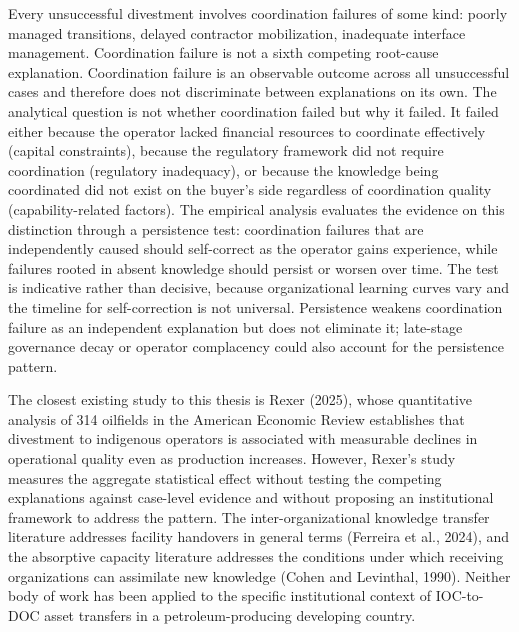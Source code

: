 Every unsuccessful divestment involves coordination failures of some
kind: poorly managed transitions, delayed contractor mobilization,
inadequate interface management. Coordination failure is not a sixth
competing root-cause explanation. Coordination failure is an observable
outcome across all unsuccessful cases and therefore does not
discriminate between explanations on its own. The analytical question is
not whether coordination failed but why it failed. It failed either
because the operator lacked financial resources to coordinate
effectively (capital constraints), because the regulatory framework did
not require coordination (regulatory inadequacy), or because the
knowledge being coordinated did not exist on the buyer's side regardless
of coordination quality (capability-related factors). The empirical
analysis evaluates the evidence on this distinction through a
persistence test: coordination failures that are independently caused
should self-correct as the operator gains experience, while failures
rooted in absent knowledge should persist or worsen over time. The test
is indicative rather than decisive, because organizational learning
curves vary and the timeline for self-correction is not universal.
Persistence weakens coordination failure as an independent explanation
but does not eliminate it; late-stage governance decay or operator
complacency could also account for the persistence pattern.

The closest existing study to this thesis is Rexer (2025), whose
quantitative analysis of 314 oilfields in the American Economic Review
establishes that divestment to indigenous operators is associated with
measurable declines in operational quality even as production increases.
However, Rexer's study measures the aggregate statistical effect without
testing the competing explanations against case-level evidence and
without proposing an institutional framework to address the pattern. The
inter-organizational knowledge transfer literature addresses facility
handovers in general terms (Ferreira et al., 2024), and the absorptive
capacity literature addresses the conditions under which receiving
organizations can assimilate new knowledge (Cohen and Levinthal, 1990).
Neither body of work has been applied to the specific institutional
context of IOC-to-DOC asset transfers in a petroleum-producing
developing country.

